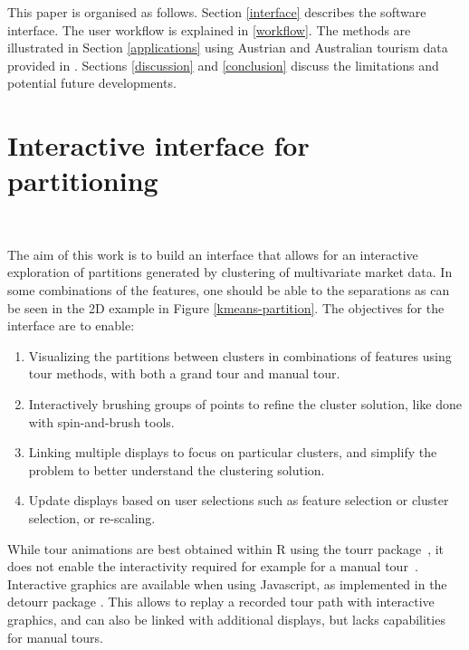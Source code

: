 \documentclass[article]{ajs}
\begin{document}

This paper is organised as follows. Section \ref{interface} describes the software interface. The user workflow is explained in \ref{workflow}. The methods are illustrated in Section \ref{applications} using Austrian and Australian tourism data provided in \cite{leisch2018market}. Sections \ref{discussion} and \ref{conclusion} discuss the limitations and potential future developments.

\section{Interactive interface for partitioning}~\label{interface}

The aim of this work is to build an interface that allows for an interactive exploration of partitions generated by clustering of multivariate market data. In some combinations of the features, one should be able to the separations as can be seen in the 2D example in Figure \ref{kmeans-partition}. The objectives for the interface are to enable:

\begin{enumerate}
\item Visualizing the partitions between clusters in combinations of features using tour methods, with both a grand tour and manual tour.
\item Interactively brushing groups of points to refine the cluster solution, like done with spin-and-brush tools.
\item Linking multiple displays to focus on particular clusters, and simplify the problem to better understand the clustering solution. 
\item Update displays based on user selections such as feature selection or cluster selection, or re-scaling.
\end{enumerate}

While tour animations are best obtained within R using the tourr package~\citep{tourr}, it does not enable the interactivity required for example for a manual tour~\citep{laa2023new}. Interactive graphics are available when using Javascript, as implemented in the detourr package \citep{RJ-2023-052}. This allows to replay a recorded tour path with interactive graphics, and can also be linked with additional displays, but lacks capabilities for manual tours.
\end{document}
